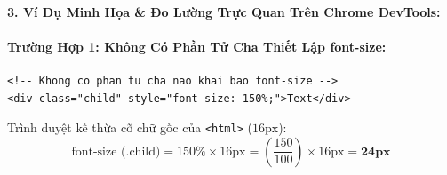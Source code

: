\documentclass[11pt,oneside]{book}
\newcommand{\codeinline}[1]{\textcolor{accentOrange}{\texttt{#1}}}
\begin{document}
\paragraph{3. Ví Dụ Minh Họa \& Đo Lường Trực Quan Trên Chrome DevTools:}

\paragraph{Trường Hợp 1: Không Có Phần Tử Cha Thiết Lập font-size:}

\begin{codeWindow}
\begin{lstlisting}[language=HTML5]
<!-- Khong co phan tu cha nao khai bao font-size -->
<div class="child" style="font-size: 150%;">Text</div>
\end{lstlisting}
\end{codeWindow}

\begin{conceptBox}
Trình duyệt kế thừa cỡ chữ gốc của \codeinline{<html>} ($16\text{px}$):
\[
\text{font-size (.child)} = 150\% \times 16\text{px} = \left(\frac{150}{100}\right) \times 16\text{px} = \mathbf{24\text{px}}
\]
\end{conceptBox}
\end{document}
